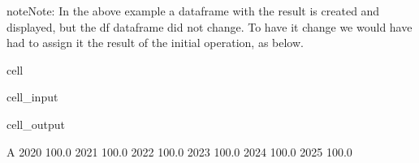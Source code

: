 \documentclass[letterpaper,10pt,english]{jupyterBook}
\begin{document}
\begin{sphinxadmonition}{note}{Note:}
\sphinxAtStartPar
In the above example a  dataframe with the result is created and displayed, but the df dataframe did not change.  To have it change we would have had to assign it the result of the initial operation, as below.
\end{sphinxadmonition}

\begin{sphinxuseclass}{cell}\begin{sphinxVerbatimInput}

\begin{sphinxuseclass}{cell_input}
\begin{sphinxVerbatim}[commandchars=\\\{\}]
\end{sphinxVerbatim}

\end{sphinxuseclass}\end{sphinxVerbatimInput}
\begin{sphinxVerbatimOutput}

\begin{sphinxuseclass}{cell_output}
\begin{sphinxVerbatim}[commandchars=\\\{\}]
          A
2020  100.0
2021  100.0
2022  100.0
2023  100.0
2024  100.0
2025  100.0
\end{sphinxVerbatim}

\end{sphinxuseclass}\end{sphinxVerbatimOutput}

\end{sphinxuseclass}
\end{document}
